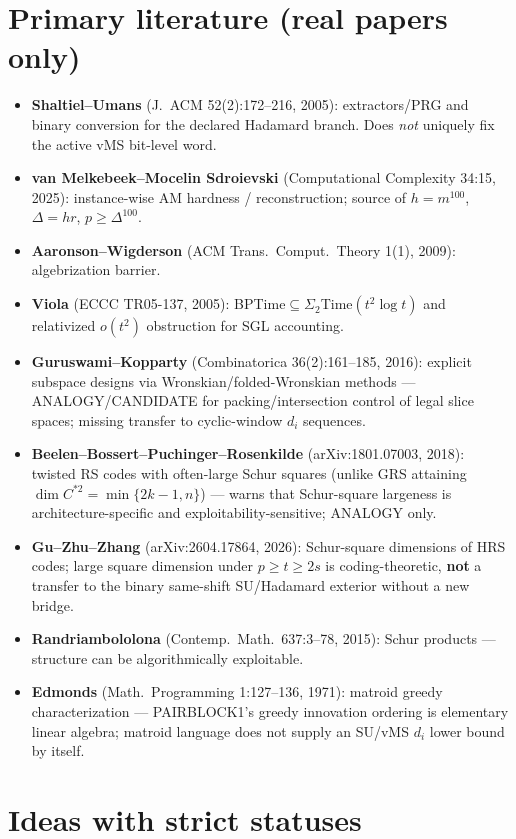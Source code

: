 \documentclass[11pt]{article}
\begin{document}
\section*{Primary literature (real papers only)}
\begin{itemize}
\item \textbf{Shaltiel--Umans} (J.~ACM 52(2):172--216, 2005): extractors/PRG and binary conversion
for the declared Hadamard branch. Does \emph{not} uniquely fix the active vMS bit-level word.
\item \textbf{van Melkebeek--Mocelin Sdroievski} (Computational Complexity 34:15, 2025): instance-wise
AM hardness / reconstruction; source of $h=m^{100}$, $\Delta=hr$, $p\ge\Delta^{100}$.
\item \textbf{Aaronson--Wigderson} (ACM Trans.\ Comput.\ Theory 1(1), 2009): algebrization barrier.
\item \textbf{Viola} (ECCC TR05-137, 2005): BPTime$\subseteq\Sigma_2$Time$(t^2\log t)$ and relativized
$o(t^2)$ obstruction for SGL accounting.
\item \textbf{Guruswami--Kopparty} (Combinatorica 36(2):161--185, 2016): explicit subspace designs via
Wronskian/folded-Wronskian methods --- ANALOGY/CANDIDATE for packing/intersection control of
legal slice spaces; missing transfer to cyclic-window $d_i$ sequences.
\item \textbf{Beelen--Bossert--Puchinger--Rosenkilde} (arXiv:1801.07003, 2018): twisted RS codes with
often-large Schur squares (unlike GRS attaining $\dim C^{*2}=\min\{2k-1,n\}$) --- warns that
Schur-square largeness is architecture-specific and exploitability-sensitive; ANALOGY only.
\item \textbf{Gu--Zhu--Zhang} (arXiv:2604.17864, 2026): Schur-square dimensions of HRS codes;
large square dimension under $p\ge t\ge 2s$ is coding-theoretic, \textbf{not} a transfer to the
binary same-shift SU/Hadamard exterior without a new bridge.
\item \textbf{Randriambololona} (Contemp.\ Math.\ 637:3--78, 2015): Schur products --- structure can be
algorithmically exploitable.
\item \textbf{Edmonds} (Math.\ Programming 1:127--136, 1971): matroid greedy characterization ---
PAIRBLOCK1's greedy innovation ordering is elementary linear algebra; matroid language does not
supply an SU/vMS $d_i$ lower bound by itself.
\end{itemize}

\section*{Ideas with strict statuses}
\end{document}
